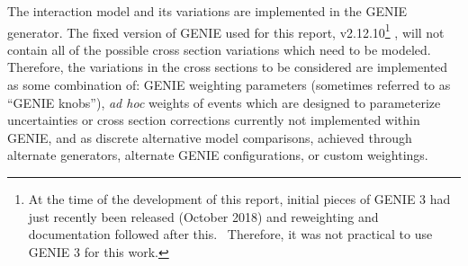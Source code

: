 

The interaction model and its variations are implemented in the  GENIE generator.  The fixed version of GENIE used for this report, v2.12.10\footnote{At the time of the development of this report, initial pieces of GENIE 3 had just recently been released (October 2018) and reweighting and documentation followed after this.  Therefore, it was not practical to use GENIE 3 for this work.}
, will not contain all of the possible cross section variations which need to be modeled.  Therefore, the variations in the cross sections to be considered are implemented as some combination of: GENIE weighting parameters (sometimes referred to as ``GENIE knobs''), {\it ad hoc} weights of events which are designed to parameterize uncertainties or cross section corrections currently not implemented within GENIE, and as discrete alternative model comparisons, achieved through alternate generators, alternate GENIE configurations, or custom weightings. 


